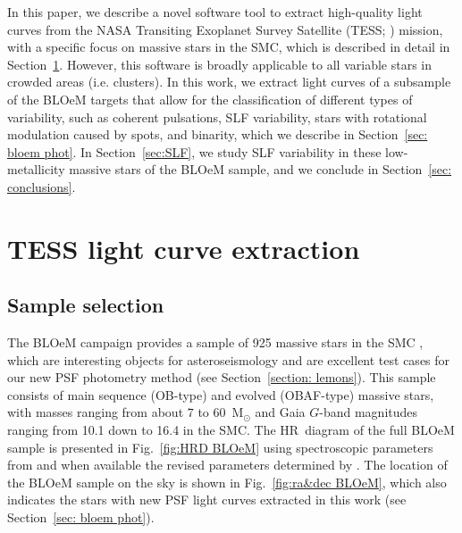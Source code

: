 \documentclass[fleqn,usenatbib]{mnras}
\begin{document}
In this paper, we describe a novel software tool to extract high-quality light curves from the NASA Transiting Exoplanet Survey Satellite (TESS; \citealt{Ricker2015, TESS_2021}) mission, with a specific focus on massive stars in the SMC, which is described in detail in Section~\ref{sec: TESS}. However, this software is broadly applicable to all variable stars in crowded areas (i.e. clusters). In this work, we extract light curves of a subsample of the BLOeM targets that allow for the classification of different types of variability, such as coherent pulsations, SLF variability, stars with rotational modulation caused by spots, and binarity, which we describe in Section~\ref{sec: bloem phot}. In Section~\ref{sec:SLF}, we study SLF variability in these low-metallicity massive stars of the BLOeM sample, and we conclude in Section~\ref{sec: conclusions}.

\section{TESS light curve extraction}
\label{sec: TESS}

\subsection{Sample selection}\label{sec: sample selection}

The BLOeM campaign provides a sample of 925 massive stars in the SMC \citep{BLOeM2024}, which are interesting objects for asteroseismology and are excellent test cases for our new PSF photometry method (see Section~\ref{section: lemons}). This sample consists of main sequence (OB-type) and evolved (OBAF-type) massive stars, with masses ranging from about $7$ to $60$~M$_\odot$ and {\sc Gaia} $G$-band magnitudes ranging from 10.1 down to 16.4 in the SMC. The HR~diagram of the full BLOeM sample is presented in Fig.~\ref{fig:HRD BLOeM} using spectroscopic parameters from \citet{BLOeM2024} and when available the revised parameters determined by \citet{Bestenlehner+2025}. The location of the BLOeM sample on the sky is shown in Fig.~\ref{fig:ra&dec BLOeM}, which also indicates the stars with new PSF light curves extracted in this work (see Section~\ref{sec: bloem phot}).
\end{document}
